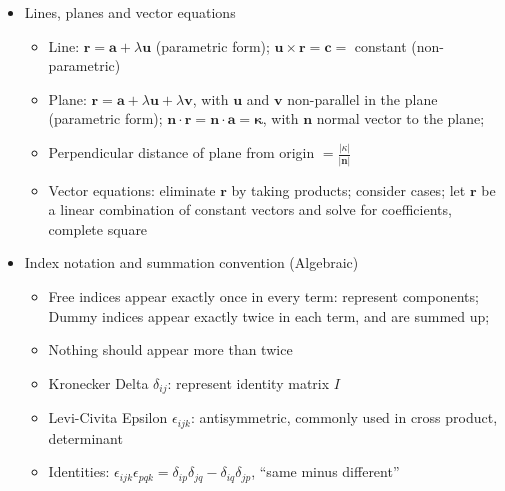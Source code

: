 \begin{itemize}
\begin{itemize}
            \end{itemize}
      \item Lines, planes and vector equations
            \begin{itemize}
                  \item Line: $\mathbf{r}=\mathbf{a}+\lambda\mathbf{u}$ (parametric form);
                        $\mathbf{u}\times\mathbf{r}=\mathbf{c}=$ constant (non-parametric)
                  \item Plane: $\mathbf{r}=\mathbf{a}+\lambda\mathbf{u}+\lambda\mathbf{v}$,
                        with $\mathbf{u}$ and $\mathbf{v}$ non-parallel in the plane (parametric
                        form); $\mathbf{n}\cdot\mathbf{r}=\mathbf{n\cdot a=\kappa}$, with
                        $\mathbf{n}$ normal vector to the plane;
                  \item Perpendicular distance of plane from origin $={\displaystyle \frac{|\kappa|}{|\mathbf{n}|}}$
                  \item Vector equations: eliminate $\mathbf{r}$ by taking products; consider
                        cases; let $\mathbf{r}$ be a linear combination of constant vectors
                        and solve for coefficients, complete square
            \end{itemize}
      \item Index notation and summation convention (Algebraic)
            \begin{itemize}
                  \item Free indices appear exactly once in every term: represent components;
                        Dummy indices appear exactly twice in each term, and are summed up;
                  \item Nothing should appear more than twice
                  \item Kronecker Delta $\delta_{ij}$: represent identity matrix $I$
                  \item Levi-Civita Epsilon $\epsilon_{ijk}$: antisymmetric, commonly used
                        in cross product, determinant
                  \item Identities: $\epsilon_{ijk}\epsilon_{pqk}=\delta_{ip}\delta_{jq}-\delta_{iq}\delta_{jp}$,
                        ``same minus different''
            \end{itemize}
\end{itemize}


